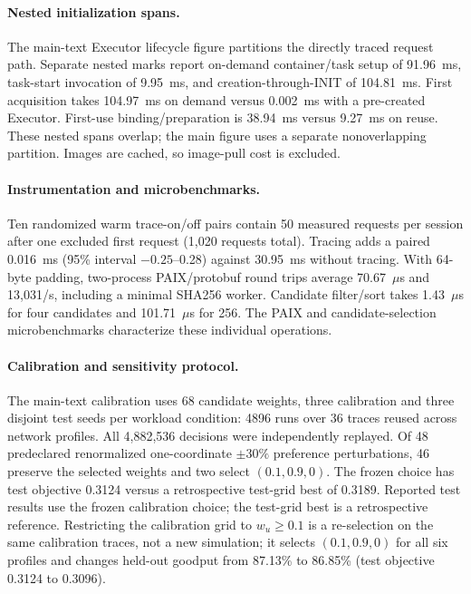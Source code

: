 \paragraph{Nested initialization spans.}
The main-text Executor lifecycle figure partitions the directly traced request path. Separate nested marks report on-demand container/task setup of 91.96~ms, task-start invocation of 9.95~ms, and creation-through-INIT of 104.81~ms. First acquisition takes 104.97~ms on demand versus 0.002~ms with a pre-created Executor. First-use binding/preparation is 38.94~ms versus 9.27~ms on reuse. These nested spans overlap; the main figure uses a separate nonoverlapping partition. Images are cached, so image-pull cost is excluded.

\paragraph{Instrumentation and microbenchmarks.}
Ten randomized warm trace-on/off pairs contain 50 measured requests per session after one excluded first request (1,020 requests total). Tracing adds a paired 0.016~ms (95\% interval $-0.25$--0.28) against 30.95~ms without tracing. With 64-byte padding, two-process PAIX/protobuf round trips average 70.67~$\mu$s and 13,031/s, including a minimal SHA256 worker. Candidate filter/sort takes 1.43~$\mu$s for four candidates and 101.71~$\mu$s for 256. The PAIX and candidate-selection microbenchmarks characterize these individual operations.

\paragraph{Calibration and sensitivity protocol.}
The main-text calibration uses 68 candidate weights, three calibration and three disjoint test seeds per workload condition: 4896 runs over 36 traces reused across network profiles. All 4,882,536 decisions were independently replayed. Of 48 predeclared renormalized one-coordinate $\pm30\%$ preference perturbations, 46 preserve the selected weights and two select $(0.1,0.9,0)$. The frozen choice has test objective 0.3124 versus a retrospective test-grid best of 0.3189. Reported test results use the frozen calibration choice; the test-grid best is a retrospective reference. Restricting the calibration grid to $w_u\ge0.1$ is a re-selection on the same calibration traces, not a new simulation; it selects $(0.1,0.9,0)$ for all six profiles and changes held-out goodput from 87.13\% to 86.85\% (test objective 0.3124 to 0.3096).

